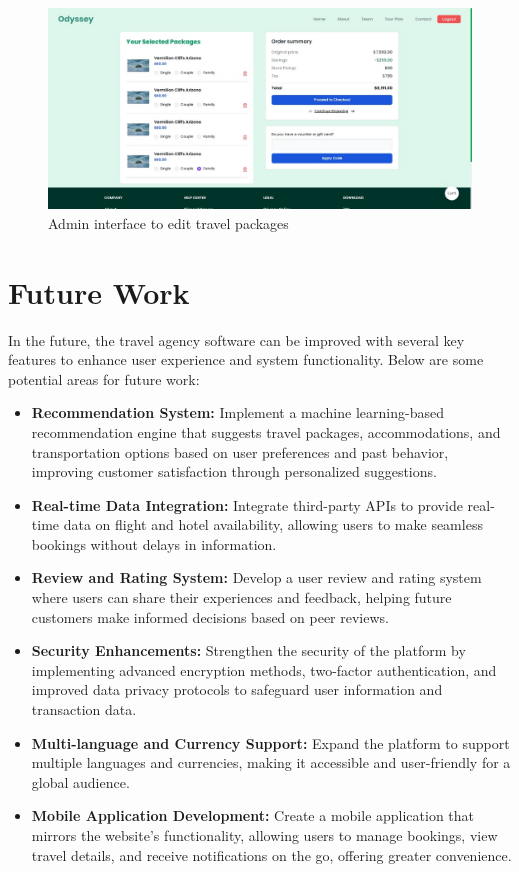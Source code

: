 \documentclass{scrreprt}
\begin{document}
\begin{figure}[h!]
    \centering
    \includegraphics[width=1.1\textwidth, height=0.35\textheight]{./SS/pkg_edit.jpg}
    \caption{Admin interface to edit travel packages}
    \label{fig:pkg_edit}
\end{figure}

\chapter{Future Work}
In the future, the travel agency software can be improved with several key features to enhance user experience and system functionality. Below are some potential areas for future work:

\begin{itemize}
    \item \textbf{Recommendation System:} Implement a machine learning-based recommendation engine that suggests travel packages, accommodations, and transportation options based on user preferences and past behavior, improving customer satisfaction through personalized suggestions.
    
    \item \textbf{Real-time Data Integration:} Integrate third-party APIs to provide real-time data on flight and hotel availability, allowing users to make seamless bookings without delays in information.
    
    \item \textbf{Review and Rating System:} Develop a user review and rating system where users can share their experiences and feedback, helping future customers make informed decisions based on peer reviews.
    
    \item \textbf{Security Enhancements:} Strengthen the security of the platform by implementing advanced encryption methods, two-factor authentication, and improved data privacy protocols to safeguard user information and transaction data.
    
    \item \textbf{Multi-language and Currency Support:} Expand the platform to support multiple languages and currencies, making it accessible and user-friendly for a global audience.
    
    \item \textbf{Mobile Application Development:} Create a mobile application that mirrors the website’s functionality, allowing users to manage bookings, view travel details, and receive notifications on the go, offering greater convenience.
\end{itemize}
\end{document}
